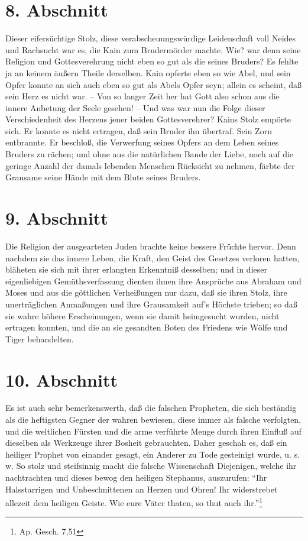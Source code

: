 \section{8. Abschnitt}

Dieser eifersüchtige Stolz, diese verabscheuungswürdige Leidenschaft voll Neides und Rachsucht war es, die Kain zum Brudermörder machte. Wie? war denn seine Religion und Gottesverehrung nicht eben so gut als die seines Bruders? Es fehlte ja an keinem äußern Theile derselben. Kain opferte eben so wie Abel, und sein Opfer konnte an sich auch eben so gut als  Abels Opfer seyn; allein es scheint, daß sein Herz es nicht war. -- Von so langer Zeit her hat Gott also schon aus die innere Anbetung der Seele gesehen! -- Und was war nun die Folge dieser Verschiedenheit des Herzens jener beiden Gottesverehrer? Kains Stolz empörte sich. Er konnte es nicht ertragen, daß sein Bruder ihn übertraf. Sein Zorn entbrannte. Er beschloß, die Verwerfung seines Opfers an dem Leben seines Bruders zu rächen; und ohne aus die natürlichen Bande der Liebe, noch auf die geringe Anzahl der damals lebenden Menschen Rücksicht zu nehmen, färbte der Grausame seine Hände mit dem Blute seines Bruders.

\section{9. Abschnitt}

Die Religion der ausgearteten Juden brachte keine bessere Früchte hervor. Denn nachdem sie das innere Leben, die Kraft, den Geist des Gesetzes verloren hatten, bläheten sie sich mit ihrer erlangten Erkenntniß desselben; und in dieser eigenliebigen Gemüthsverfassung dienten ihnen ihre Ansprüche aus Abraham und Moses und aus die göttlichen Verheißungen nur dazu, daß sie ihren Stolz, ihre unerträglichen Anmaßungen und ihre Grausamkeit auf's Höchste trieben; so daß sie wahre höhere Erscheinungen, wenn sie damit heimgesucht wurden, nicht ertragen konnten, und die an sie gesandten Boten des Friedens wie Wölfe und Tiger behandelten.

\section{10. Abschnitt}

Es ist auch sehr bemerkenswerth, daß die falschen Propheten, die sich beständig als die heftigsten Gegner der wahren bewiesen, diese immer als falsche verfolgten, und die weltlichen Fürsten und die arme verführte Menge durch ihren Einfluß auf dieselben als Werkzeuge ihrer Bosheit gebrauchten. Daher geschah es, daß ein heiliger Prophet von einander gesagt, ein Anderer zu Tode gesteinigt wurde, u. s. w. So stolz und steifsinnig macht die falsche Wissenschaft Diejenigen, welche ihr nachtrachten und dieses bewog den heiligen Stephanus, auszurufen: "`Ihr Halsstarrigen und Unbeschnittenen an Herzen und Ohren! Ihr widerstrebet allezeit dem heiligen Geiste. Wie eure Väter thaten, so thut auch ihr."'\footnote{Ap. Gesch. 7,51}

